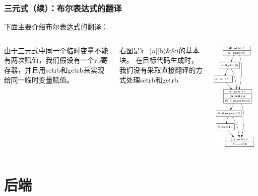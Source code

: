 \documentclass{beamer}
\begin{document}
\begin{frame}
	\frametitle{三元式（续）：布尔表达式的翻译}
	下面主要介绍布尔表达式的翻译：
	\begin{columns}
			由于三元式中同一个临时变量不能有两次赋值，我们假设有一个rb寄存器，并且用setrb和getrb来实现给同一临时变量赋值。

右图是k=(a||b)\&\&i的基本块。
\alert{在目标代码生成时，我们没有采取直接翻译的方式处理setrb和getrb.}
			\begin{center}
			\includegraphics[scale=0.24]{bool_triple_example.png}
			\end{center}
	\end{columns}
\end{frame}

\section{后端}
\end{document}
